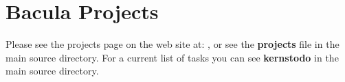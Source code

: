 
\section*{Bacula Projects}
\label{_ChapterStart28}

Please see the projects page on the web site at: 
, or
see the {\bf projects} file in the main source directory. For a current list
of tasks you can see {\bf kernstodo} in the main source directory. 
